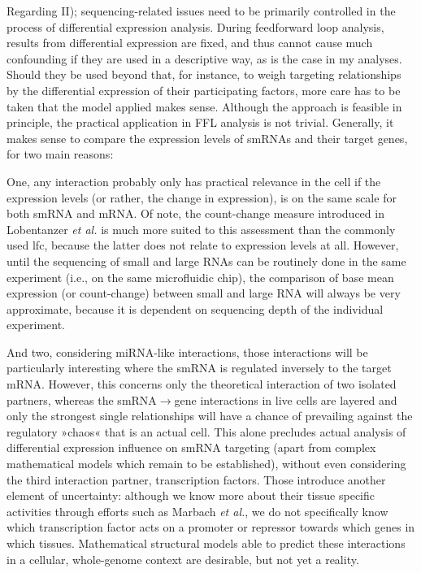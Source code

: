 Regarding II); sequencing-related issues need to be primarily controlled in the process of differential expression analysis. During feedforward loop analysis, results from differential expression are fixed, and thus cannot cause much confounding if they are used in a descriptive way, as is the case in my analyses. Should they be used beyond that, for instance, to weigh targeting relationships by the differential expression of their participating factors, more care has to be taken that the model applied makes sense. Although the approach is feasible in principle, the practical application in FFL analysis is not trivial. Generally, it makes sense to compare the expression levels of smRNAs and their target genes, for two main reasons: 

One, any interaction probably only has practical relevance in the cell if the expression levels (or rather, the change in expression), is on the same scale for both smRNA and mRNA. Of note, the count-change measure introduced in Lobentanzer \emph{et al.}\cite{Lobentanzer2019a} is much more suited to this assessment than the commonly used \ac{lfc}, because the latter does not relate to expression levels at all. However, until the sequencing of small and large RNAs can be routinely done in the same experiment (i.e., on the same microfluidic chip), the comparison of base mean expression (or count-change) between small and large RNA will always be very approximate, because it is dependent on sequencing depth of the individual experiment. 

And two, considering miRNA-like interactions, those interactions will be particularly interesting where the smRNA is regulated inversely to the target mRNA. However, this concerns only the theoretical interaction of two isolated partners, whereas the smRNA$\to$gene interactions in live cells are layered and only the strongest single relationships will have a chance of prevailing against the regulatory »chaos« that is an actual cell. This alone precludes actual analysis of differential expression influence on smRNA targeting (apart from complex mathematical models which remain to be established), without even considering the third interaction partner, transcription factors. Those introduce another element of uncertainty: although we know more about their tissue specific activities through efforts such as Marbach \emph{et al.}\cite{Marbach2016}, we do not specifically know which transcription factor acts on a promoter or repressor towards which genes in which tissues. Mathematical structural models able to predict these interactions in a cellular, whole-genome context are desirable, but not yet a reality.


